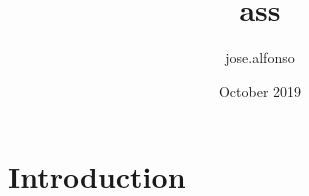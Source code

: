 \documentclass{article}
\title{ass}
\author{jose.alfonso }
\date{October 2019}
\begin{document}
\maketitle

\section{Introduction}
\end{document}
